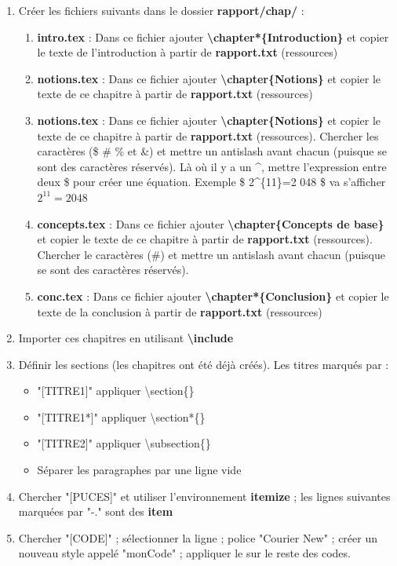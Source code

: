 \documentclass[11pt, a4paper]{article}
\begin{document}
\begin{enumerate}
	\item Créer les fichiers suivants dans le dossier \textbf{rapport/chap/} :  
	\begin{enumerate}
		\item \textbf{intro.tex} : Dans ce fichier ajouter \textbf{\textbackslash chapter*\{Introduction\} } et copier le texte de l'introduction à partir de \textbf{rapport.txt} (ressources)
		\item \textbf{notions.tex} : Dans ce fichier ajouter \textbf{\textbackslash chapter\{Notions\} } et copier le texte de ce chapitre à partir de \textbf{rapport.txt} (ressources)
		\item \textbf{notions.tex} : Dans ce fichier ajouter \textbf{\textbackslash chapter\{Notions\} } et copier le texte de ce chapitre à partir de \textbf{rapport.txt} (ressources). Chercher les caractères (\$ \# \% et \&) et mettre un antislash avant chacun (puisque se sont des caractères réservés). Là où il y a un \textasciicircum , mettre l'expression entre deux \$ pour créer une équation. Exemple \$ 2\textasciicircum \{11\}=2 048 \$  va s'afficher $2^{11}=2 048$
		\item \textbf{concepts.tex} : Dans ce fichier ajouter \textbf{\textbackslash chapter\{Concepts de base\} } et copier le texte de ce chapitre à partir de \textbf{rapport.txt} (ressources). Chercher le caractères (\#) et mettre un antislash avant chacun (puisque se sont des caractères réservés). 
		\item \textbf{conc.tex} : Dans ce fichier ajouter \textbf{\textbackslash chapter*\{Conclusion\} } et copier le texte de la conclusion à partir de \textbf{rapport.txt} (ressources)
	\end{enumerate}

	\item Importer ces chapitres en utilisant \textbf{\textbackslash include}

	\item Définir les sections (les chapitres ont été déjà créés). Les titres marqués par : 
	\begin{multicols}{2}
		\begin{itemize}
			\item "[TITRE1]" appliquer \textbackslash section\{\}
			\item "[TITRE1*]" appliquer \textbackslash section*\{\}
			\item "[TITRE2]" appliquer \textbackslash subsection\{\}
			\item Séparer les paragraphes par une ligne vide
		\end{itemize}
	\end{multicols}
	
	\item Chercher "[PUCES]" et utiliser l'environnement \textbf{itemize} ; les lignes suivantes marquées par "-." sont des \textbf{item}
	\item Chercher "[CODE]" ; sélectionner la ligne ; police "Courier New" ; créer un nouveau style appelé "monCode" ; appliquer le sur le reste des codes.
	
\end{enumerate}
\end{document}
